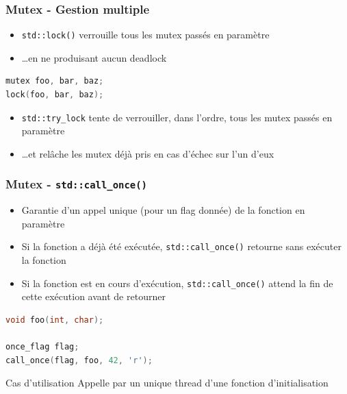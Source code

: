 \documentclass[C++.tex]{subfiles}
\begin{document}
\begin{frame}[fragile]
	\frametitle{Mutex - Gestion multiple}
	\begin{itemize}
		\item \lstinline|std::lock()| verrouille tous les mutex passés en paramètre
		\item \ldots{}en ne produisant aucun deadlock
	\end{itemize}

	\begin{lstlisting}[language=C++]
mutex foo, bar, baz;
lock(foo, bar, baz);\end{lstlisting}

	\begin{itemize}
		\item \lstinline|std::try_lock| tente de verrouiller, dans l'ordre, tous les mutex passés en paramètre
		\item \ldots{}et relâche les mutex déjà pris en cas d'échec sur l'un d'eux
	\end{itemize}
\end{frame}

\begin{frame}[fragile]
	\frametitle{Mutex - \lstinline|std::call_once()|}
	\begin{itemize}
		\item Garantie d'un appel unique (pour un flag donnée) de la fonction en paramètre
		\item Si la fonction a déjà été exécutée, \lstinline|std::call_once()| retourne sans exécuter la fonction
		\item Si la fonction est en cours d'exécution, \lstinline|std::call_once()| attend la fin de cette exécution avant de retourner
	\end{itemize}

	\begin{lstlisting}[language=C++]
void foo(int, char);

once_flag flag;
call_once(flag, foo, 42, 'r');\end{lstlisting}

	\begin{block}{Cas d'utilisation}
		Appelle par un unique thread d'une fonction d'initialisation
	\end{block}
\end{frame}
\end{document}
